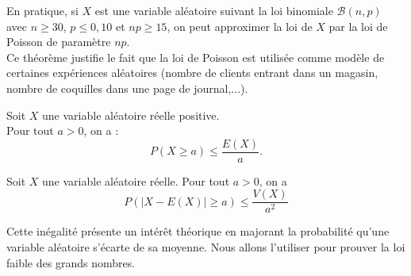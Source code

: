 \documentclass{book}
\begin{document}
En pratique, si $X$ est une variable aléatoire suivant la loi binomiale $\mathcal{B}(n,p)$ avec $n\geq 30$, $p\leq 0,10$ et $np\geq 15$, on peut approximer la loi de $X$ par la loi de Poisson de paramètre $np$.\\
Ce théorème  justifie le fait que la loi de Poisson est utilisée comme modèle de certaines expériences aléatoires (nombre de clients entrant dans un magasin, nombre de coquilles dans une page de journal,...).

\begin{Proposition}
Soit $X$ une variable aléatoire réelle positive.\\
Pour tout $a > 0$, on a :
\[ P(X\geq a) \leq \frac{E(X)}{a}.\]
\end{Proposition}
\begin{Proposition}
Soit $X$ une variable aléatoire réelle.
Pour tout $a>0$, on a
\[ P( |X-E(X)| \geq a ) \leq \frac{V(X)}{a^2} \]
\end{Proposition}
Cette inégalité présente un intérêt théorique en majorant la
probabilité qu'une variable aléatoire s'écarte de sa moyenne. Nous allons l'utiliser pour prouver la loi faible des grands
nombres.
\end{document}
